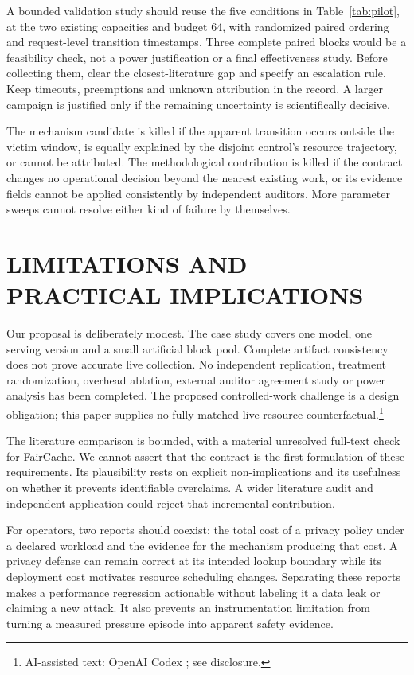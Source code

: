 \documentclass[a4paper,twoside]{article}
\newcommand{\aicite}{\footnote{AI-assisted text: OpenAI Codex \cite{codex}; see disclosure.}}
\begin{document}
A bounded validation study should reuse the five conditions in Table~\ref{tab:pilot}, at the two existing capacities and budget 64, with randomized paired ordering and request-level transition timestamps. Three complete paired blocks would be a feasibility check, not a power justification or a final effectiveness study. Before collecting them, clear the closest-literature gap and specify an escalation rule. Keep timeouts, preemptions and unknown attribution in the record. A larger campaign is justified only if the remaining uncertainty is scientifically decisive.

The mechanism candidate is killed if the apparent transition occurs outside the victim window, is equally explained by the disjoint control's resource trajectory, or cannot be attributed. The methodological contribution is killed if the contract changes no operational decision beyond the nearest existing work, or its evidence fields cannot be applied consistently by independent auditors. More parameter sweeps cannot resolve either kind of failure by themselves.

\section{\uppercase{Limitations and Practical Implications}}

Our proposal is deliberately modest. The case study covers one model, one serving version and a small artificial block pool. Complete artifact consistency does not prove accurate live collection. No independent replication, treatment randomization, overhead ablation, external auditor agreement study or power analysis has been completed. The proposed controlled-work challenge is a design obligation; this paper supplies no fully matched live-resource counterfactual.\aicite

The literature comparison is bounded, with a material unresolved full-text check for FairCache. We cannot assert that the contract is the first formulation of these requirements. Its plausibility rests on explicit non-implications and its usefulness on whether it prevents identifiable overclaims. A wider literature audit and independent application could reject that incremental contribution.

For operators, two reports should coexist: the total cost of a privacy policy under a declared workload and the evidence for the mechanism producing that cost. A privacy defense can remain correct at its intended lookup boundary while its deployment cost motivates resource scheduling changes. Separating these reports makes a performance regression actionable without labeling it a data leak or claiming a new attack. It also prevents an instrumentation limitation from turning a measured pressure episode into apparent safety evidence.
\end{document}
